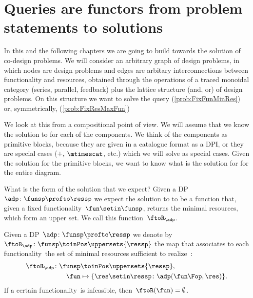 \section{Queries are functors from problem statements to solutions}

\publictodomessage

In this and the following chapters we are going to build towards the solution of co-design problems.
We will consider an arbitrary graph of design problems, in which nodes are design problems and edges are arbitary interconnections between functionality and resources, obtained through the operations of a traced monoidal category (series, parallel, feedback) plus the lattice structure (and, or) of design problems.
On this structure we want to solve the query \FixFunMinRes (\cref{prob:FixFunMinRes}) or, symmetrically, \FixResMaxFun (\cref{prob:FixResMaxFun})

We look at this from a compositional point of view.
We will assume that we know the solution to \FixFunMinRes for each of the components.
We think of the components as primitive blocks, because they are given in a catalogue format as a DPI, or they are special cases ($+$, $\mtimescat$, etc.) which we will solve as special cases.
Given the solution for the primitive blocks, we want to know what is the solution for \FixFunMinRes for the entire diagram.

What is the form of the solution that we expect?
Given a DP~$\adp\colon \funsp \profto \ressp$ we expect the solution to \FixFunMinRes to be a function that, given a fixed functionality~$\fun\setin\funsp$, returns the minimal resources, which form an upper set.
We call this function~$\ftoR_\adp$.

\begin{definition}
    \label{def:ftoR-dp}
    Given a DP~$\adp\colon\funsp\profto\ressp$ we denote by~$\ftoR_{\adp}\colon \funsp\toinPos \uppersets{\ressp}$ the map that associates to each functionality~\fun the set of minimal resources sufficient to realize~\fun:
    \begin{equation*}
        \begin{aligned}
            \ftoR_{\adp}\colon \funsp & \toinPos \uppersets{\ressp}, \\
            \fun                      & \mapsto \{ \res \setin \ressp \colon \adp(\fun\Fop, \res)\}.
        \end{aligned}
    \end{equation*}
    If a certain functionality~\fun is infeasible, then~$\ftoR(\fun)=\emptyset$.
\end{definition}


